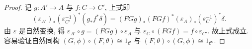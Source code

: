 \begin{theorem}
\begin{proof}
        记 $g : A' \to A$ 与 $f: C \to C'$, 上式即
        \begin{equation}
            (\varepsilon _{A'})_\ast (\varepsilon _{C'}^{-1})^\ast (g_\ast f^\ast \delta) = (FGg)_\ast (FGf)^\ast (\varepsilon _A)_\ast (\varepsilon _C^{-1})^\ast \delta.
        \end{equation}
        由 $\varepsilon$ 是自然变换, 得 $\varepsilon_{A'} \circ g = (FGg) \circ \varepsilon _A$ 与 $\varepsilon _C \circ (FGf) = f \circ \varepsilon _{C'}$. 故上式成立.
        \\
        容易验证自然同构 $(G, \phi) \circ (F, \theta) \cong 1_{\mathcal{C}}$ 与 $(F, \theta) \circ (G, \phi) \cong 1_{\mathcal{C}'}$.
    \end{proof}
\end{theorem}





